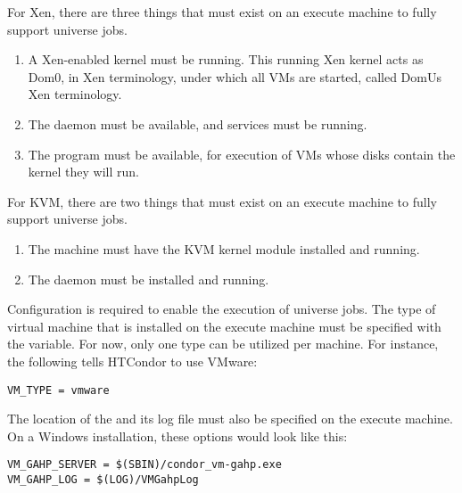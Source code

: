 For Xen, there are three things that must exist on 
an execute machine to fully support  universe jobs. 
\begin{enumerate}
\item
A Xen-enabled kernel must be running. 
This running Xen kernel acts as Dom0, in Xen terminology, 
under which all VMs are started, called DomUs Xen terminology. 

\item
The  daemon must be available,
and  services must be running. 

\item
The  program must be available,
for execution of VMs whose disks contain the kernel they will run.
\end{enumerate}

For KVM, there are two things that must exist on
an execute machine to fully support  universe jobs. 
\begin{enumerate}
\item
The machine must have the KVM kernel module installed and running.

\item
The  daemon must be installed and running.

\end{enumerate}

Configuration is required to enable the execution of
 universe jobs.
The type of virtual machine that is installed on the
execute machine must be specified with the  variable. 
For now, only one type can be utilized per machine.
For instance, the following tells HTCondor to use VMware:

\begin{verbatim}
VM_TYPE = vmware
\end{verbatim}

The location of the  and
its log file must also be specified on the execute machine.
On a Windows installation, these options would look like this:

\begin{verbatim}
VM_GAHP_SERVER = $(SBIN)/condor_vm-gahp.exe
VM_GAHP_LOG = $(LOG)/VMGahpLog
\end{verbatim}



